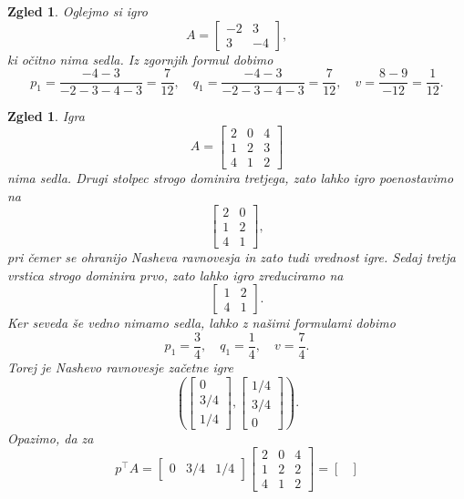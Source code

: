 \documentclass[10pt, a4paper]{article}
\newtheorem{zgled}[izr]{Zgled}
\begin{document}
\begin{zgled}
  Oglejmo si igro 
  $$A = \begin{bmatrix}
    -2 & 3\\
    3 & -4
  \end{bmatrix},$$
  ki očitno nima sedla. Iz zgornjih formul dobimo 
  $$p_1 = \frac{-4-3}{-2-3-4-3} = \frac{7}{12},\quad q_1 = \frac{-4 - 3}{-2-3-4-3} = \frac{7}{12},\quad v = \frac{8 - 9}{-12} = \frac{1}{12}.$$
\end{zgled}

\begin{zgled}
  Igra
  $$A = \begin{bmatrix}
    2 & 0 & 4\\
    1 & 2 & 3\\
    4 & 1 & 2
  \end{bmatrix}$$
  nima sedla. Drugi stolpec strogo dominira tretjega, zato lahko igro poenostavimo na 
  $$\begin{bmatrix}
    2 & 0 \\
    1 & 2 \\
    4 & 1
  \end{bmatrix},$$
  pri čemer se ohranijo Nasheva ravnovesja in zato tudi vrednost igre.
  Sedaj tretja vrstica strogo dominira prvo, zato lahko igro zreduciramo na 
  $$\begin{bmatrix}
    1 & 2 \\
    4 & 1
  \end{bmatrix}.$$
  Ker seveda še vedno nimamo sedla, lahko z našimi formulami dobimo 
  $$p_1 = \frac{3}{4},\quad q_1 = \frac{1}{4},\quad v = \frac{7}{4}.$$
  Torej je Nashevo ravnovesje začetne igre 
  $$\left(\begin{bmatrix}
    0\\ 3/4 \\ 1/4
  \end{bmatrix},
  \begin{bmatrix}
    1/4 \\ 3/4 \\ 0
  \end{bmatrix}\right).$$
  Opazimo, da za 
  $$p^\top A = \begin{bmatrix}
    0 & 3/4 & 1/4
  \end{bmatrix}
  \begin{bmatrix}
    2 & 0 & 4\\
    1 & 2 & 2\\
    4 & 1 & 2
  \end{bmatrix} = \begin{bmatrix}

\end{bmatrix}$$
\end{zgled}
\end{document}
